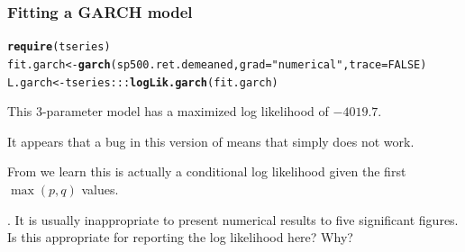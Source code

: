 \documentclass{beamer}\usepackage[]{graphicx}\usepackage[]{color}
\makeatletter
\newcommand{\hlnum}[1]{\textcolor[rgb]{0.686,0.059,0.569}{#1}}%
\newcommand{\hlstr}[1]{\textcolor[rgb]{0.192,0.494,0.8}{#1}}%
\newcommand{\hlopt}[1]{\textcolor[rgb]{0,0,0}{#1}}%
\newcommand{\hlstd}[1]{\textcolor[rgb]{0.345,0.345,0.345}{#1}}%
\newcommand{\hlkwb}[1]{\textcolor[rgb]{0.69,0.353,0.396}{#1}}%
\newcommand{\hlkwc}[1]{\textcolor[rgb]{0.333,0.667,0.333}{#1}}%
\newcommand{\hlkwd}[1]{\textcolor[rgb]{0.737,0.353,0.396}{\textbf{#1}}}%
\newenvironment{kframe}{%
 \def\at@end@of@kframe{}%
 \ifinner\ifhmode%
  \def\at@end@of@kframe{\end{minipage}}%
  \begin{minipage}{\columnwidth}%
 \fi\fi%
 \def\FrameCommand##1{\hskip\@totalleftmargin \hskip-\fboxsep
 \colorbox{shadecolor}{##1}\hskip-\fboxsep
     \hskip-\linewidth \hskip-\@totalleftmargin \hskip\columnwidth}%
 \MakeFramed {\advance\hsize-\width
   \@totalleftmargin\z@ \linewidth\hsize
   \@setminipage}}%
 {\par\unskip\endMakeFramed%
 \at@end@of@kframe}
\newenvironment{knitrout}{}{} %
\newcommand\answer[2]{#1} %
\makeatother
\begin{document}
\begin{frame}[fragile]

\frametitle{Fitting a GARCH model}

\begin{knitrout}\small
{}\color{fgcolor}\begin{kframe}
\begin{alltt}
\hlkwd{require}\hlstd{(tseries)}
\hlstd{fit.garch} \hlkwb{<-} \hlkwd{garch}\hlstd{(sp500.ret.demeaned,}\hlkwc{grad} \hlstd{=} \hlstr{"numerical"}\hlstd{,} \hlkwc{trace} \hlstd{=} \hlnum{FALSE}\hlstd{)}
\hlstd{L.garch} \hlkwb{<-} \hlstd{tseries}\hlopt{:::}\hlkwd{logLik.garch}\hlstd{(fit.garch)}
\end{alltt}
\end{kframe}
\end{knitrout}

\bi

\item This 3-parameter model has a maximized log likelihood of $-4019.7$.

\item It appears that a bug in this version of  means that simply  does not work.

\item From  we learn this is actually a conditional log likelihood given the first $\max(p,q)$ values.

\ei

\vspace{3mm}

\myquestion. It is usually inappropriate to present numerical results to five significant figures. Is this appropriate for reporting the log likelihood here? Why?

\answer{\vspace{30mm}}{todo}

\end{frame}
\end{document}
